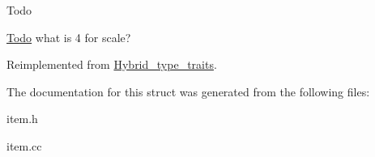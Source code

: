 \begin{DoxyRefDesc}{Todo}
\item[\mbox{\hyperlink{todo__todo000025}{Todo}}]what is \textquotesingle{}4\textquotesingle{} for scale? \end{DoxyRefDesc}


Reimplemented from \mbox{\hyperlink{structHybrid__type__traits}{Hybrid\+\_\+type\+\_\+traits}}.



The documentation for this struct was generated from the following files\+:\begin{DoxyCompactItemize}
\item 
item.\+h\item 
item.\+cc\end{DoxyCompactItemize}
